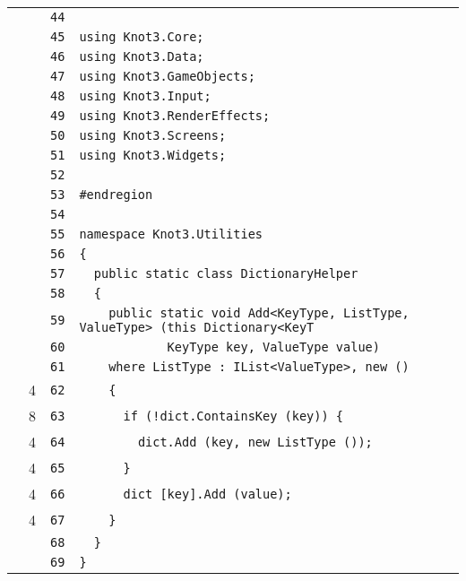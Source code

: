 \documentclass[a4paper,10pt]{article}
\begin{document}
\begin{longtable}[l]{lrrl}
\cellcolor{gray} &  & \verb~44~ & \verb~~\\
\cellcolor{gray} &  & \verb~45~ & \verb~using Knot3.Core;~\\
\cellcolor{gray} &  & \verb~46~ & \verb~using Knot3.Data;~\\
\cellcolor{gray} &  & \verb~47~ & \verb~using Knot3.GameObjects;~\\
\cellcolor{gray} &  & \verb~48~ & \verb~using Knot3.Input;~\\
\cellcolor{gray} &  & \verb~49~ & \verb~using Knot3.RenderEffects;~\\
\cellcolor{gray} &  & \verb~50~ & \verb~using Knot3.Screens;~\\
\cellcolor{gray} &  & \verb~51~ & \verb~using Knot3.Widgets;~\\
\cellcolor{gray} &  & \verb~52~ & \verb~~\\
\cellcolor{gray} &  & \verb~53~ & \verb~#endregion~\\
\cellcolor{gray} &  & \verb~54~ & \verb~~\\
\cellcolor{gray} &  & \verb~55~ & \verb~namespace Knot3.Utilities~\\
\cellcolor{gray} &  & \verb~56~ & \verb~{~\\
\cellcolor{gray} &  & \verb~57~ & \verb~  public static class DictionaryHelper~\\
\cellcolor{gray} &  & \verb~58~ & \verb~  {~\\
\cellcolor{gray} &  & \verb~59~ & \verb~    public static void Add<KeyType, ListType, ValueType> (this Dictionary<KeyT~\\
\cellcolor{gray} &  & \verb~60~ & \verb~            KeyType key, ValueType value)~\\
\cellcolor{gray} &  & \verb~61~ & \verb~    where ListType : IList<ValueType>, new ()~\\
\cellcolor{green} & 4 & \verb~62~ & \verb~    {~\\
\cellcolor{green} & 8 & \verb~63~ & \verb~      if (!dict.ContainsKey (key)) {~\\
\cellcolor{green} & 4 & \verb~64~ & \verb~        dict.Add (key, new ListType ());~\\
\cellcolor{green} & 4 & \verb~65~ & \verb~      }~\\
\cellcolor{green} & 4 & \verb~66~ & \verb~      dict [key].Add (value);~\\
\cellcolor{green} & 4 & \verb~67~ & \verb~    }~\\
\cellcolor{gray} &  & \verb~68~ & \verb~  }~\\
\cellcolor{gray} &  & \verb~69~ & \verb~}~\\
\end{longtable}
\newpage
\end{document}
